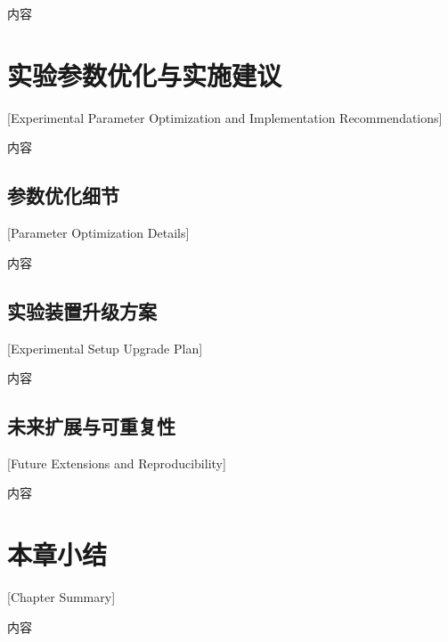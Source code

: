 内容

\section{实验参数优化与实施建议}[Experimental Parameter Optimization and Implementation Recommendations]

内容

\subsection{参数优化细节}[Parameter Optimization Details]

内容

\subsection{实验装置升级方案}[Experimental Setup Upgrade Plan]

内容

\subsection{未来扩展与可重复性}[Future Extensions and Reproducibility]

内容

\section{本章小结}[Chapter Summary]

内容 